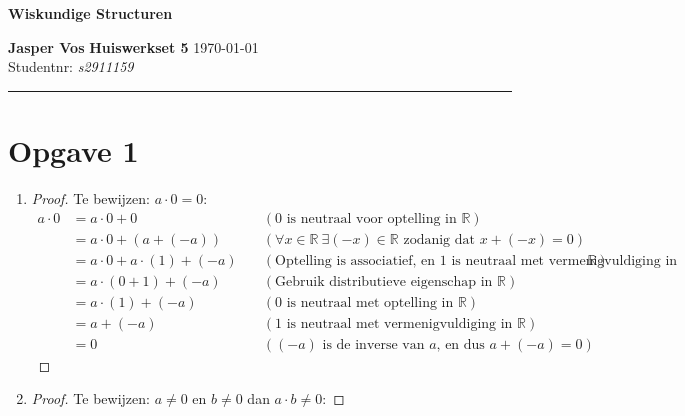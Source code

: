 \documentclass{article}
\newcommand{\tx}[1]{\text{#1}}
\newcommand{\R}{\mathbb{R}}
\newcommand{\zdd}{\tx{ zodanig dat }}
\begin{document}
{\Large \textbf{Wiskundige Structuren}}

\bigskip

\textbf{Jasper Vos} \hfill \textbf{Huiswerkset 5} \hfill \today \\
Studentnr: \emph{s2911159}

\rule{\textwidth}{2pt}

\bigskip

\section*{Opgave 1}

\begin{enumerate}[label=\alph*)]
    \item
    \begin{proof}
    Te bewijzen: $a \cdot 0 = 0$:
    \begin{align*}
        a\cdot 0 &= a \cdot 0 + 0 &\quad (0 \tx{ is neutraal voor optelling in } \R)\\
        &= a\cdot 0 + (a + (-a)) &\quad (\forall x \in \R \ \exists (-x) \in \R \zdd x + (-x) = 0) \\
        &= a \cdot 0 + a\cdot (1) + (-a) &\quad (\tx{Optelling is associatief, en $1$ is neutraal met vermenigvuldiging in }\R) \\
        &= a \cdot ( 0 + 1) + (-a) &\quad (\tx{Gebruik distributieve eigenschap in }\R) \\
        &= a \cdot (1) + (-a) &\quad (0\tx{ is neutraal met optelling in } \R) \\
        &= a + (-a) &\quad (1 \tx{ is neutraal met vermenigvuldiging in } \R) \\
        &= 0 &\quad ((-a)\tx{ is de inverse van $a$, en dus } a + (-a) = 0 )
    \end{align*}
    \end{proof}
    \item 
    \begin{proof}
    Te bewijzen: $a \neq 0$ en $b \neq 0$ dan $a \cdot b \neq 0$: 
    

\end{proof}
\end{enumerate}
\end{document}
